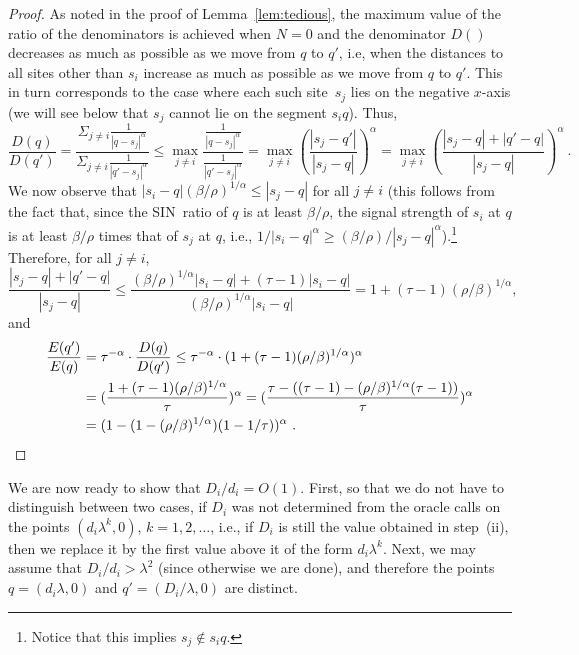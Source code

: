 \documentclass[11pt]{article}
\theoremstyle{remark}
\begin{document}
\begin{enumerate}[(i)]
\begin{proof}
  As noted in the proof of Lemma~\ref{lem:tedious},
the maximum value of the ratio of the denominators is achieved when $N=0$ and the denominator $D()$ decreases as much as possible as we move from $q$ to $q'$, i.e, when the distances to all sites other than $s_i$ increase as much as possible as we move from $q$ to $q'$. This in turn corresponds to the case where each such site~$s_j$ lies on the negative $x$-axis (we will see below that $s_j$ cannot lie on the segment $s_iq$). Thus,
  \[
     \frac{D(q)}{D(q')} = \frac{\Sigma_{j \ne i}{\frac{1}{|q-s_j|^\alpha}}}{\Sigma_{j \ne i}{\frac{1}{|q'-s_j|^\alpha}}} \le
     \max_{j \ne i}\frac{\frac{1}{|q-s_j|^\alpha}}{\frac{1}{|q'-s_j|^\alpha}} = \max_{j \ne i}(\frac{|s_j-q'|}{|s_j-q|})^\alpha =
     \max_{j \ne i}(\frac{|s_j-q|+|q'-q|}{|s_j-q|})^\alpha \ .
  \]
  We now observe that
  $|s_i-q| (\beta/\rho)^{1/\alpha} \leq |s_j-q|$ for all $j \ne i$ (this follows from the fact that, since the SIN~ratio of $q$ is at least $\beta/\rho$, the signal strength of $s_i$ at $q$ is at least $\beta/\rho$ times that of $s_j$ at $q$, i.e., $1/|s_i-q|^\alpha \geq (\beta/\rho)/|s_j-q|^\alpha$).\footnote{
    Notice that this implies $s_j \not\in s_iq$.}
  Therefore, for all $j\neq i$,
  \[
    \frac{|s_j-q|+|q'-q|}{|s_j-q|} \leq \frac{(\beta/\rho)^{1/\alpha} |s_i-q|+(\tau-1)|s_i-q|}{(\beta/\rho)^{1/\alpha}
      |s_i-q|} =
{1+(\tau-1)(\rho/\beta)^{1/\alpha}},
  \]
  and
  \begin{align*}
    \frac{E(q')}{E(q)} & = \tau^{-\alpha} \cdot \frac{D(q)}{D(q')} \le
    \tau^{-\alpha} \cdot (1+(\tau-1)(\rho/\beta)^{1/\alpha})^\alpha \\
    & = (\frac{1+(\tau-1)(\rho/\beta)^{1/\alpha}}{\tau})^\alpha 
    = (\frac{\tau - ((\tau-1)-(\rho/\beta)^{1/\alpha}(\tau-1))} {\tau})^\alpha\\
    &
      = (1 - (1 - (\rho/\beta)^{1/\alpha})(1 - 1/\tau))^\alpha\ .
      \qedhere
\end{align*}
\end{proof}

We are now ready to show that $D_i/d_i = O(1)$.
First, so that we do not have to distinguish between two cases, if $D_i$ was not determined from the oracle calls on the points $(d_i\lambda^k,0)$, $k=1,2,\ldots$, i.e., if $D_i$ is still the value obtained in step~(ii), then we replace it by the first value above it of the form $d_i\lambda^k$. 
Next, we may assume that $D_i/d_i>\lambda^2$ (since otherwise we are done),
and therefore the points $q = (d_i\lambda,0)$ and $q' = (D_i/\lambda,0)$ are distinct.


\end{enumerate}
\end{document}
